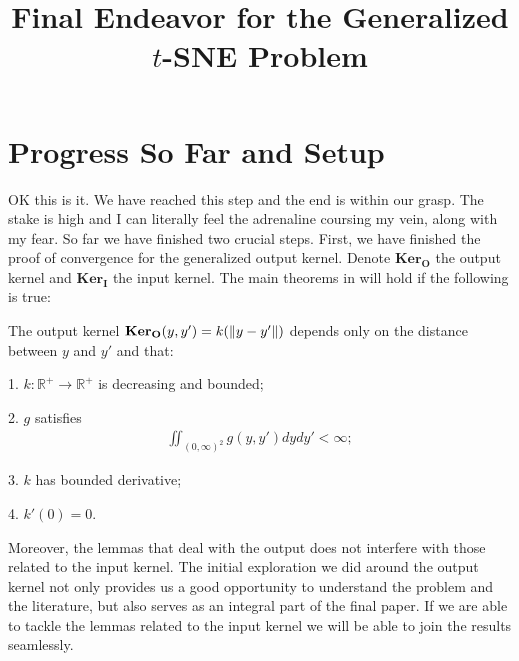 \documentclass[10pt]{article}
\newcommand{\ki}{\mathbf{Ker}_{\mathbf{I}}}
\newcommand{\ko}{\mathbf{Ker}_{\mathbf{O}}}
\begin{document}
\title{Final Endeavor for the Generalized \texorpdfstring{$t$}{Lg}-SNE Problem}
\maketitle

\section{Progress So Far and Setup}
OK this is it. We have reached this step and the end is within our grasp. The
stake is high and I can literally feel the adrenaline coursing my vein, along
with my fear. So far we have finished two crucial steps. First, we have
finished the proof of convergence for the generalized output kernel. Denote
$\ko$ the output kernel and $\ki$ the input kernel. The main theorems in
\cite{auffinger-tsne} will hold if the following is true:
\begin{condition} \label{output_kernel_conditions}
  The output kernel $\ko(y,y') = k (\norm{y-y'})$ depends only on the distance between $y$ and $y'$ and that:

  1. $k: \mathbb{R}^+ \to \mathbb{R}^+$ is decreasing and bounded;

  2. $g$ satisfies
  \begin{align}
    \iint_{(0,\infty)^2} g(y,y') dy dy' < \infty;
  \end{align}

  3. $k$ has bounded derivative;

  4. $k'(0) = 0$.
\end{condition}
Moreover, the lemmas that deal with the output does not interfere with those related to the input kernel. The initial exploration we did around the output kernel not only provides us a good opportunity to understand the problem and the literature, but also serves as an integral part of the final paper. If we are able to tackle the lemmas related to the input kernel we will be able to join the results seamlessly.
\end{document}
